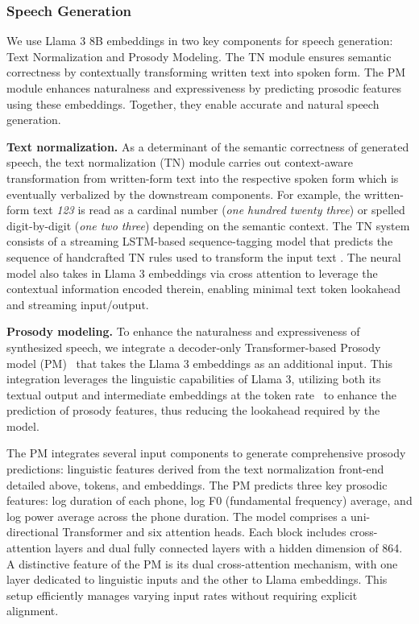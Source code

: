 \documentclass[dvipsnames]{fairmeta}
\begin{document}
\subsubsection{Speech Generation}

We use Llama 3 8B embeddings in two key components for speech generation: Text Normalization and Prosody Modeling. The TN module ensures semantic correctness by contextually transforming written text into spoken form. The PM module enhances naturalness and expressiveness by predicting prosodic features using these embeddings. Together, they enable accurate and natural speech generation.

\textbf{Text normalization.}
As a determinant of the semantic correctness of generated speech, the text normalization (TN) module carries out context-aware transformation from written-form text into the respective spoken form which is eventually verbalized by the downstream components. For example, the written-form text \emph{123} is read as a cardinal number (\emph{one hundred twenty three}) or spelled digit-by-digit (\emph{one two three}) depending on the semantic context. The TN system consists of a streaming LSTM-based sequence-tagging model that predicts the sequence of handcrafted TN rules used to transform the input text \citep{kang2024tn}. The neural model also takes in Llama 3 embeddings via cross attention to leverage the contextual information encoded therein, enabling minimal text token lookahead and streaming input/output.

\textbf{Prosody modeling.}
\label{sec:tts:pm}
To enhance the naturalness and expressiveness of synthesized speech, we integrate a decoder-only Transformer-based Prosody model (PM)~\citep{radford2021learning} that takes the Llama 3 embeddings as an additional input. This integration leverages the linguistic capabilities of Llama 3, utilizing both its textual output and intermediate embeddings at the token rate~\citep{devlin2018bert, dong2019unified, raffel2020exploring, guo2023prompttts} to enhance the prediction of prosody features, thus reducing the lookahead required by the model.

The PM integrates several input components to generate comprehensive prosody predictions: linguistic features derived from the text normalization front-end detailed above, tokens, and embeddings. The PM predicts three key prosodic features: log duration of each phone, log F0 (fundamental frequency) average, and log power average across the phone duration. The model comprises a uni-directional Transformer and six attention heads. Each block includes cross-attention layers and dual fully connected layers with a hidden dimension of 864. A distinctive feature of the PM is its dual cross-attention mechanism, with one layer dedicated to linguistic inputs and the other to Llama embeddings. This setup efficiently manages varying input rates without requiring explicit alignment.
\end{document}
